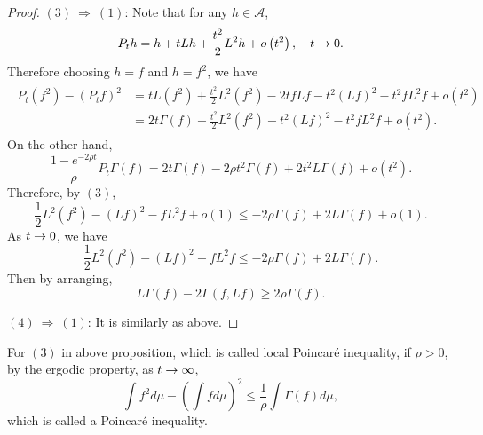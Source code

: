 \begin{proof}
    $(3)~\Rightarrow~(1)$: Note that for any $h \in \mathcal{A}$,
    \begin{equation*}
    	P_t h=h+t L h+\frac{t^2}{2} L^2 h+o\left(t^2\right),\quad t \rightarrow 0.
    \end{equation*}
    Therefore choosing $h = f$ and $h = f^2$, we have
    \begin{align*}
    	\begin{aligned}
			P_t\left(f^2\right)-\left(P_t f\right)^2 & =t L\left(f^2\right)+\frac{t^2}{2} L^2\left(f^2\right)-2 t f L f-t^2(L f)^2-t^2 f L^2 f+o\left(t^2\right) \\
			& =2 t \Gamma(f)+\frac{t^2}{2} L^2\left(f^2\right)-t^2(L f)^2-t^2 f L^2 f+o\left(t^2\right).
		\end{aligned}
    \end{align*}
    On the other hand,
    \begin{equation*}
    	\frac{1-e^{-2 \rho t}}{\rho} P_t \Gamma(f)=2 t \Gamma(f)-2 \rho t^2 \Gamma(f)+2 t^2 L \Gamma(f)+o\left(t^2\right).
    \end{equation*}
    Therefore, by $(3)$,
    \begin{equation*}
    	\frac{1}{2} L^2\left(f^2\right)-(L f)^2- f L^2 f+o(1) \leq -2 \rho \Gamma(f)+2 L \Gamma(f)+o(1).
    \end{equation*}
    As $t \rightarrow 0$, we have
    \begin{equation*}
    	\frac{1}{2} L^2\left(f^2\right)-(L f)^2- f L^2 f \leq -2 \rho \Gamma(f)+2 L \Gamma(f).
    \end{equation*}
    Then by arranging,
    \begin{equation*}
    	L \Gamma(f)-2 \Gamma(f, L f) \geq 2 \rho \Gamma(f).
    \end{equation*}

    $(4)~\Rightarrow~(1)$: It is similarly as above. \qedhere

\end{proof}

For $(3)$ in above proposition, which is called local Poincar\'e inequality, if $\rho > 0$, by the ergodic property, as $t \rightarrow \infty$,
\begin{equation*}
	\int f^2 d \mu-\left(\int f d \mu\right)^2 \leq \frac{1}{\rho} \int \Gamma(f) d \mu,
\end{equation*}
which is called a Poincar\'e inequality.

